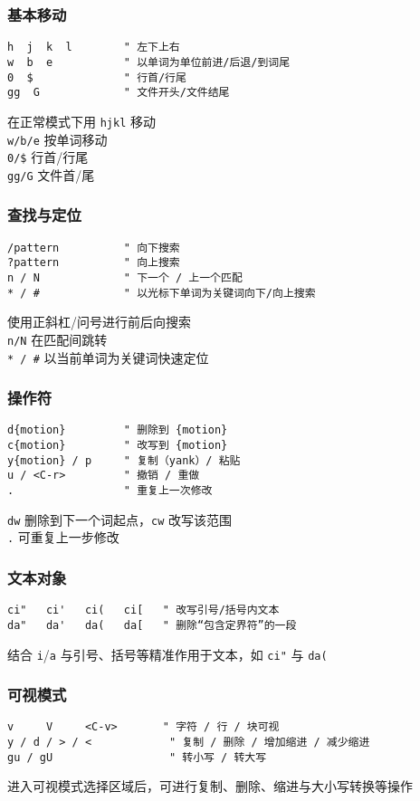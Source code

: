 \documentclass[a4paper,12pt]{ctexart}
\begin{document}
\subsubsection{基本移动}
\begin{lstlisting}
h  j  k  l        " 左下上右
w  b  e           " 以单词为单位前进/后退/到词尾
0  $              " 行首/行尾
gg  G             " 文件开头/文件结尾
\end{lstlisting}
在正常模式下用 \texttt{hjkl} 移动 \\ \texttt{w/b/e} 按单词移动 \\ \texttt{0/\$} 行首/行尾 \\ \texttt{gg/G} 文件首/尾

\subsubsection{查找与定位}
\begin{lstlisting}
/pattern          " 向下搜索
?pattern          " 向上搜索
n / N             " 下一个 / 上一个匹配
* / #             " 以光标下单词为关键词向下/向上搜索
\end{lstlisting}
使用正斜杠/问号进行前后向搜索 \\ \texttt{n/N} 在匹配间跳转 \\ \texttt{* / \#} 以当前单词为关键词快速定位

\subsubsection{操作符}
\begin{lstlisting}
d{motion}         " 删除到 {motion}
c{motion}         " 改写到 {motion}
y{motion} / p     " 复制（yank）/ 粘贴
u / <C-r>         " 撤销 / 重做
.                 " 重复上一次修改
\end{lstlisting}
\texttt{dw} 删除到下一个词起点，\texttt{cw} 改写该范围 \\ \texttt{.} 可重复上一步修改

\subsubsection{文本对象}
\begin{lstlisting}
ci"   ci'   ci(   ci[   " 改写引号/括号内文本
da"   da'   da(   da[   " 删除“包含定界符”的一段
\end{lstlisting}
结合 \texttt{i}/\texttt{a} 与引号、括号等精准作用于文本，如 \texttt{ci"} 与 \texttt{da(}

\subsubsection{可视模式}
\begin{lstlisting}
v     V     <C-v>       " 字符 / 行 / 块可视
y / d / > / <            " 复制 / 删除 / 增加缩进 / 减少缩进
gu / gU                  " 转小写 / 转大写
\end{lstlisting}
进入可视模式选择区域后，可进行复制、删除、缩进与大小写转换等操作
\end{document}
